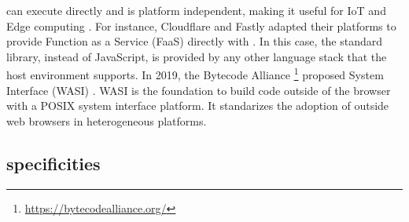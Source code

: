 can execute directly and is platform independent, making it useful for IoT and Edge computing \cite{Narayan2021Swivel,Sledge}. For instance, Cloudflare and Fastly adapted their platforms to provide Function as a Service (FaaS) directly with \wasm. In this case, the standard library, instead of JavaScript, is provided by any other language stack that the host environment supports.
In 2019, the Bytecode Alliance \footnote{\url{https://bytecodealliance.org/}} proposed System Interface (WASI) \cite{WASI}. WASI is the foundation to build code outside of the browser with a POSIX system interface platform. It standarizes the adoption of \wasm outside web browsers \cite{bryant2020webassembly} in heterogeneous platforms. 










\subsection*{specificities}

